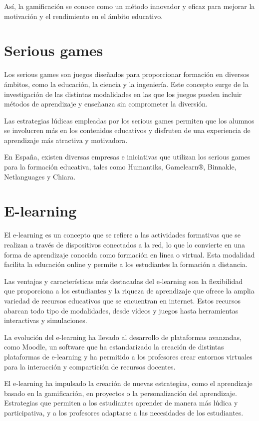 Así, la gamificación se conoce como un método innovador y eficaz para mejorar la motivación y el rendimiento en el ámbito educativo.

\section{Serious games}
\cite{seriousgames} Los serious games son juegos diseñados para proporcionar formación en diversos ámbitos, como la educación, la ciencia y la ingeniería. Este concepto surge de la investigación de las distintas modalidades en las que los juegos pueden incluir métodos de aprendizaje y enseñanza sin comprometer la diversión.

Las estrategias lúdicas empleadas por los serious games permiten que los alumnos se involucren más en los contenidos educativos y disfruten de una experiencia de aprendizaje más atractiva y motivadora.

En España, existen diversas empresas e iniciativas que utilizan los serious games para la formación educativa, tales como Humantiks, Gamelearn®, Binnakle, Netlanguages y Chiara.


\section{E-learning}
\cite{e-learning} El e-learning es un concepto que se refiere a las actividades formativas que se realizan a través de dispositivos conectados a la red, lo que lo convierte en una forma de aprendizaje conocida como formación en línea o virtual. Esta modalidad facilita la educación online y permite a los estudiantes la formación a distancia.

Las ventajas y características más destacadas del e-learning son la flexibilidad que proporciona a los estudiantes y la riqueza de aprendizaje que ofrece la amplia variedad de recursos educativos que se encuentran en internet. Estos recursos abarcan todo tipo de modalidades, desde vídeos y juegos hasta herramientas interactivas y simulaciones.

\cite{e-learning2} La evolución del e-learning ha llevado al desarrollo de plataformas avanzadas, como Moodle, un software que ha estandarizado la creación de distintas plataformas de e-learning y ha permitido a los profesores crear entornos virtuales para la interacción y compartición de recursos docentes.

El e-learning ha impulsado la creación de nuevas estrategias, como el aprendizaje basado en la gamificación, en proyectos o la personalización del aprendizaje. Estrategias que permiten a los estudiantes aprender de manera más lúdica y participativa, y a los profesores adaptarse a las necesidades de los estudiantes.



